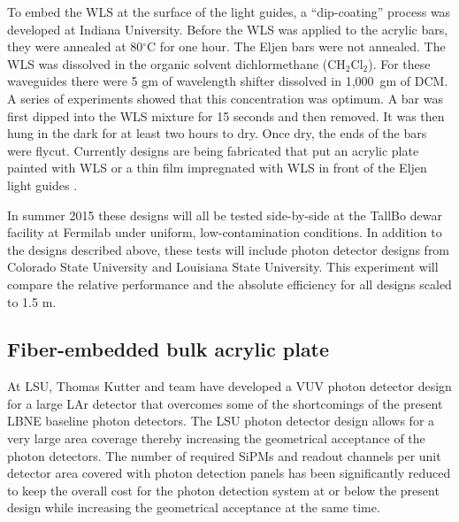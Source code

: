 To embed the WLS at the surface of the light guides, a ``dip-coating''
process was developed at Indiana University.  Before the WLS was
applied to the acrylic bars, they were annealed at 80$^\circ$C for one
hour.  The Eljen bars were not annealed.  The WLS was dissolved in the
organic solvent dichlormethane (CH$_2$Cl$_2$).  For these waveguides
there were 5 gm of wavelength shifter dissolved in 1,000~gm of DCM.  A
series of experiments showed that this concentration was optimum.  A
bar was first dipped into the WLS mixture for 15 seconds and then
removed.  It was then hung in the dark for at least two hours to dry.
Once dry, the ends of the bars were flycut.  Currently designs are
being fabricated that put an acrylic plate painted with WLS or a thin
film impregnated with WLS in front of the Eljen light guides .

In summer 2015 these designs will all be tested side-by-side at the
TallBo dewar facility at Fermilab under uniform, low-contamination
conditions.  In addition to the designs described above, these tests
will include photon detector designs from Colorado State University
and Louisiana State University.  This experiment will compare the
relative performance and the absolute efficiency for all designs
scaled to 1.5 m.

\subsection{Fiber-embedded bulk acrylic plate}

At LSU, Thomas Kutter and team have developed a VUV photon detector
design for a large LAr detector that overcomes some of the
shortcomings of the present LBNE baseline photon detectors. The LSU
photon detector design allows for a very large area coverage thereby
increasing the geometrical acceptance of the photon detectors. The
number of required SiPMs and readout channels per unit detector area
covered with photon detection panels has been significantly reduced to
keep the overall cost for the photon detection system at or below the
present design while increasing the geometrical acceptance at the same
time.

